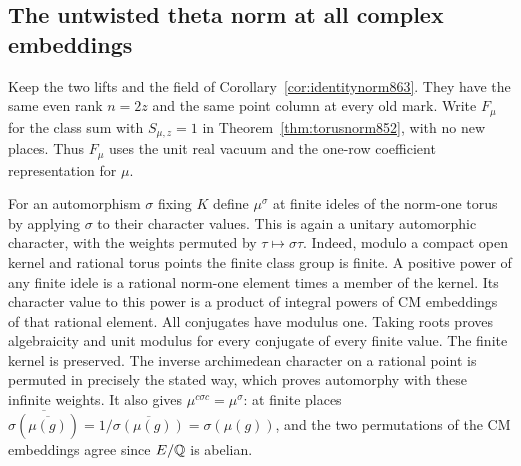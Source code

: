 \documentclass[a4paper,11pt]{article}
\theoremstyle{definition}
\theoremstyle{remark}
\numberwithin{equation}{section}
\begin{document}
\subsection{The untwisted theta norm at all complex embeddings}
\label{sec:allnorm865}
Keep the two lifts and the field of Corollary~\ref{cor:identitynorm863}.
They have the same even rank \(n=2z\) and the same point column
at every old mark. Write \(F_\mu\) for the class sum with
\(S_{\mu,z}=1\) in Theorem~\ref{thm:torusnorm852}, with no
new places. Thus \(F_\mu\) uses the unit real vacuum and the
one-row coefficient representation for \(\mu\).

For an automorphism \(\sigma\) fixing \(K\) define \(\mu^\sigma\)
at finite ideles of the norm-one torus by applying \(\sigma\)
to their character values. This is again a unitary automorphic
character, with the weights permuted by \(\tau\mapsto\sigma\tau\).
Indeed, modulo a compact open kernel and rational torus points
the finite class group is finite. A positive power of any finite
idele is a rational norm-one element times a member of the kernel.
Its character value to this power is a product of integral
powers of CM embeddings of that rational element. All conjugates
have modulus one. Taking roots proves algebraicity and unit
modulus for every conjugate of every finite value. The finite
kernel is preserved. The inverse archimedean character on a
rational point is permuted in precisely the stated way, which
proves automorphy with these infinite weights. It also gives
\(\mu^{c\sigma c}=\mu^\sigma\): at finite places
\(\overline{\sigma(\overline{\mu(g)})}
   =1/\overline{\sigma(\mu(g))}=\sigma(\mu(g))\),
and the two permutations of the CM embeddings agree since
\(E/\mathbb Q\) is abelian.
\end{document}
